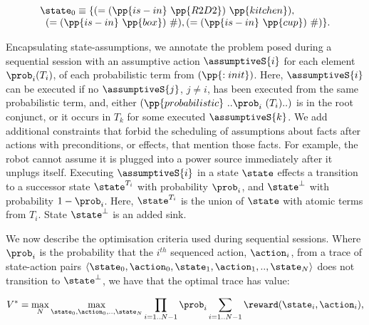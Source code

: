 \small
\[
\begin{array}{l}
\state_0 \equiv \{(=(\pp{is-in}~\pp{R2D2})~\pp{kitchen}),\\
\;\;(=(\pp{is-in}~\pp{box})~\#), (=(\pp{is-in}~\pp{cup})~\#)\}.
\end{array}
\]
\normalsize

Encapsulating state-assumptions, we annotate the problem posed during
a sequential session with an assumptive action $\assumptiveS{i}$ for
each element $\prob_i (T_i)$, of each probabilistic term from
$(\pp{:init})$. Here, $\assumptiveS{i}$ can be executed if no
$\assumptiveS{j}$, $j \neq i$, has been executed from the same
probabilistic term, and, either
$(\pp{probabilistic}~..\prob_i~(T_i)..)$ is in the root conjunct, or
it occurs in $T_k$ for some executed $\assumptiveS{k}$.
We add additional constraints that forbid the scheduling of
assumptions about facts after actions with preconditions, or effects,
that mention those facts. For example, the robot cannot assume it is
plugged into a power source immediately after it unplugs itself.
Executing $\assumptiveS{i}$ in a state $\state$ effects a transition
to a successor state $\state^{T_i}$ with probability $\prob_i$, and
$\state^\bot$ with probability $1 - \prob_i$. Here, $\state^{T_i}$ is
the union of $\state$ with atomic terms from $T_i$. State
$\state^\bot$ is an added sink.


We now describe the optimisation criteria used during sequential
sessions. Where $\prob_i$ is the probability that the $i^{th}$
sequenced action, $\action_i$, from a trace of state-action pairs
$\langle \state_0, \action_0,\state_1, \action_1,.., \state_N \rangle$
does not transition to $\state^\bot$, we have that the optimal trace
has value:




\small
\[
V^* = \max_N \max_{\state_0, \action_0,.., \state_N} \prod_{i=1..N-1} \prob_i \sum_{i=1..N-1}
\reward(\state_i, \action_i),
\]
\normalsize


